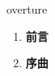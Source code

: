 
\begin{frame}
{\huge overture}
\begin{center}
\begin{enumerate}\Large
  \item \textbf{前言}
  \item \textbf{序曲}
\end{enumerate}
\end{center}
\end{frame}
